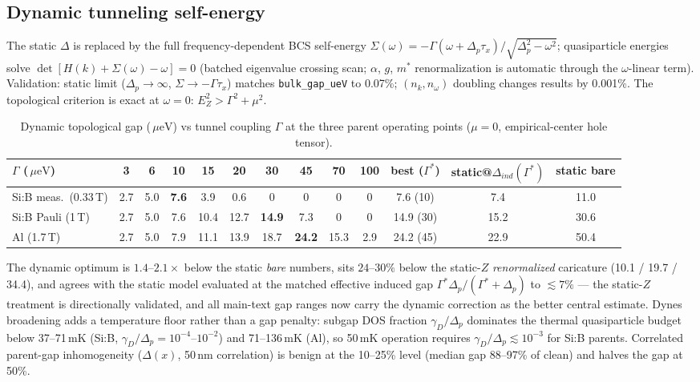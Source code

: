 \documentclass[11pt]{article}
\newcommand{\ueV}{\,\mu\mathrm{eV}}
\begin{document}
\subsection{Dynamic tunneling self-energy}\label{s:dynse}
The static $\Delta$ is replaced by the full frequency-dependent BCS
self-energy $\Sigma(\omega) = -\Gamma(\omega + \Delta_p\tau_x)/
\sqrt{\Delta_p^2-\omega^2}$; quasiparticle energies solve
$\det[H(k)+\Sigma(\omega)-\omega]=0$ (batched eigenvalue crossing scan;
$\alpha$, $g$, $m^*$ renormalization is automatic through the
$\omega$-linear term). Validation: static limit ($\Delta_p \to \infty$,
$\Sigma \to -\Gamma\tau_x$) matches \texttt{bulk\_gap\_ueV} to 0.07\%;
$(n_k, n_\omega)$ doubling changes results by 0.001\%. The topological
criterion is exact at $\omega = 0$: $E_Z^2 > \Gamma^2 + \mu^2$.

\begin{table}[h]\centering\small
\caption{Dynamic topological gap ($\ueV$) vs tunnel coupling $\Gamma$ at the
three parent operating points ($\mu = 0$, empirical-center hole tensor).}
\label{t:dynse}
\begin{tabular}{lccccccccc|ccc}
\toprule
$\Gamma$ ($\ueV$) & 3 & 6 & 10 & 15 & 20 & 30 & 45 & 70 & 100 &
best ($\Gamma^*$) & static@$\Delta_{ind}(\Gamma^*)$ & static bare\\
\midrule
Si:B meas.\ (0.33\,T) & 2.7 & 5.0 & \textbf{7.6} & 3.9 & 0.6 & 0 & 0 & 0 & 0
 & 7.6 (10) & 7.4 & 11.0\\
Si:B Pauli (1\,T) & 2.7 & 5.0 & 7.6 & 10.4 & 12.7 & \textbf{14.9} & 7.3 & 0 & 0
 & 14.9 (30) & 15.2 & 30.6\\
Al (1.7\,T) & 2.7 & 5.0 & 7.9 & 11.1 & 13.9 & 18.7 & \textbf{24.2} & 15.3 & 2.9
 & 24.2 (45) & 22.9 & 50.4\\
\bottomrule
\end{tabular}
\end{table}

The dynamic optimum is $1.4$--$2.1\times$ below the static \emph{bare}
numbers, sits $24$--$30\%$ below the static-$Z$ \emph{renormalized}
caricature (10.1 / 19.7 / 34.4), and agrees with the static model evaluated
at the matched effective induced gap
$\Gamma^*\Delta_p/(\Gamma^*+\Delta_p)$ to $\lesssim 7\%$ --- the static-$Z$
treatment is directionally validated, and all main-text gap ranges now carry
the dynamic correction as the better central estimate. Dynes broadening
adds a temperature floor rather than a gap penalty: subgap DOS fraction
$\gamma_D/\Delta_p$ dominates the thermal quasiparticle budget below
37--71\,mK (Si:B, $\gamma_D/\Delta_p = 10^{-4}$--$10^{-2}$) and
71--136\,mK (Al), so 50\,mK operation requires
$\gamma_D/\Delta_p \lesssim 10^{-3}$ for Si:B parents. Correlated
parent-gap inhomogeneity ($\Delta(x)$, 50\,nm correlation) is benign at the
10--25\% level (median gap 88--97\% of clean) and halves the gap at 50\%.
\end{document}
